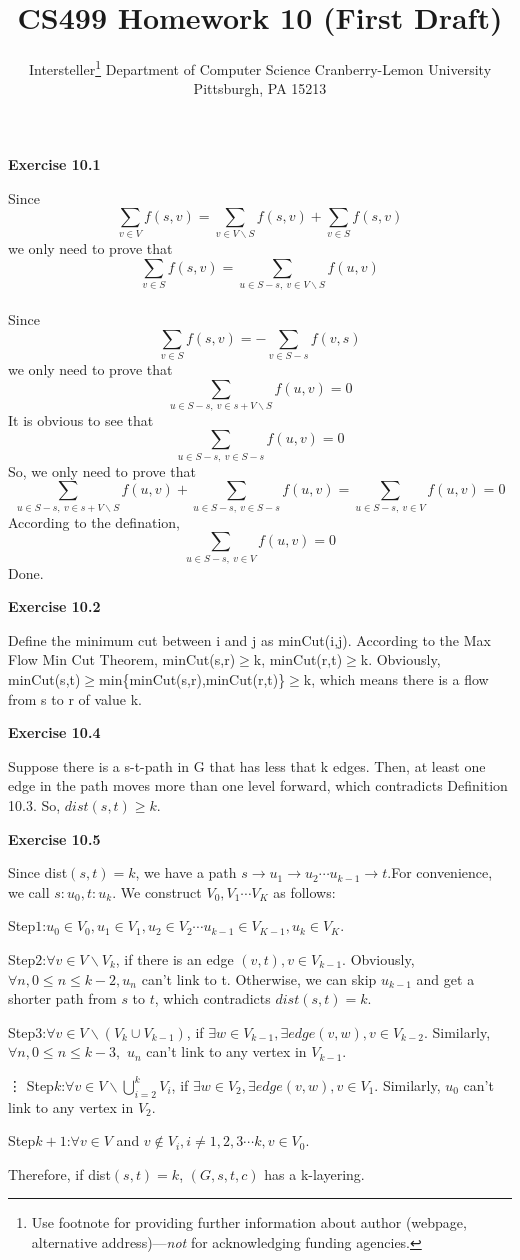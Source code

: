 \documentclass{article} %
\title{CS499 Homework 10 (First Draft)}
\author{
	Intersteller\thanks{ Use footnote for providing further information
		about author (webpage, alternative address)---\emph{not} for acknowledging
		funding agencies.}
	Department of Computer Science
	Cranberry-Lemon University
	Pittsburgh, PA 15213
}
\begin{document}
	
	
	\maketitle
	
	
	\textbf{Exercise 10.1}\par
	Since $$\sum_{v\in V}f(s,v)=\sum_{v\in V\backslash S}f(s,v)+\sum_{v\in S}f(s,v)$$ we only need to prove that $$\sum_{v\in S}f(s,v)=\sum_{u\in S-s,\ v\in V\backslash S}f(u,v)$$\\
	Since $$\sum_{v\in S}f(s,v)=-\sum_{v\in S-s}f(v,s)$$ we only need to prove that $$\sum_{u\in S-s,\ v\in s+V\backslash S}f(u,v)=0$$
	It is obvious to see that $$\sum_{u\in S-s,\ v\in S-s}f(u,v)=0$$
	So, we only need to prove that $$\sum_{u\in S-s,\ v\in s+V\backslash S}f(u,v)+\sum_{u\in S-s,\ v\in S-s}f(u,v)=\sum_{u\in S-s,\ v\in V}f(u,v)=0$$
	According to the defination, $$\sum_{u\in S-s,\ v\in V}f(u,v)=0$$
	Done.


	\textbf{Exercise 10.2}\par
	Define the minimum cut between i and j as minCut(i,j). According to the Max Flow Min Cut Theorem, minCut(s,r)$\geq$k, minCut(r,t)$\geq$k. Obviously, minCut(s,t)$\geq$min\{minCut(s,r),minCut(r,t)\}$\geq$k, which means there is a flow from s to r of value k.

	\textbf{Exercise 10.4}\par
	Suppose there is a s-t-path in G that has less that k edges. Then, at least one edge in the path moves more than one level forward, which contradicts Definition 10.3. So, $dist(s,t)\geq k$.

    \textbf{Exercise 10.5}\par
    Since dist$(s,t)=k$, we have a path $s\rightarrow u_1\rightarrow u_2 \cdots u_{k-1}\rightarrow t$.For convenience, we call $s:u_0,t:u_k$. We construct $V_0, V_1\cdots V_K$ as follows:\par
    Step$1$:$u_0\in V_0, u_1\in V_1, u_2\in V_2\cdots u_{k-1}\in V_{K-1}, u_k\in V_K.$\par
    Step$2$:$\forall v\in V \backslash V_k$, if there is an edge $(v,t), v\in V_{k-1}$. Obviously, $\forall n, 0\leq n \leq k-2, u_n$ can't link to t. Otherwise, we can skip $u_{k-1}$ and get a shorter path from $s$ to $t$, which contradicts $dist(s,t)=k$.\par
    Step$3$:$\forall v\in V \backslash (V_k\cup V_{k-1})$, if $\exists w \in V_{k-1}, \exists edge (v,w), v\in V_{k-2}.$ Similarly, $\forall n, 0\leq n\leq k-3,$ $u_n$ can't link to any vertex in $V_{k-1}.$\par
    \vdots
    Step$k$:$\forall v\in V \backslash \bigcup_{i=2}^kV_i$, if $\exists w\in V_2, \exists edge (v,w), v\in V_1.$ Similarly, $u_0$ can't link to any vertex in $V_2$.\par
    Step$k+1$:$\forall v \in V $ and $ v \notin V_i, i \neq 1,2,3\cdots k, v \in V_0$.\par
    Therefore, if dist$(s,t)=k$, $(G,s,t,c)$ has a k-layering.
\end{document}
